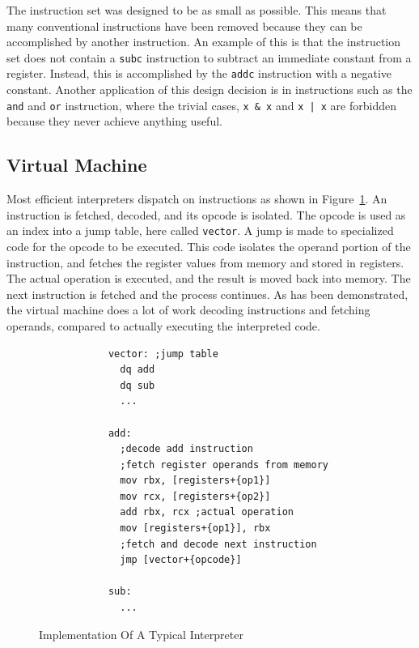 \documentclass[A4]{sig-alternate}
\begin{document}
The instruction set was designed to be as small as possible. This means that many conventional instructions have been removed because they can be accomplished by another instruction. An example of this is that the instruction set does not contain a \texttt{subc} instruction to subtract an immediate constant from a register. Instead, this is accomplished by the \texttt{addc} instruction with a negative constant. Another application of this design decision is in instructions such as the \texttt{and} and \texttt{or} instruction, where the trivial cases, \texttt{x\,\&\,x} and \texttt{x\,|\,x} are forbidden because they never achieve anything useful.

\subsection{Virtual Machine}

Most efficient interpreters dispatch on instructions as shown in Figure~\ref{code:interpreter}. An instruction is fetched, decoded, and its opcode is isolated. The opcode is used as an index into a jump table, here called \texttt{vector}. A jump is made to specialized code for the opcode to be executed. This code isolates the operand portion of the instruction, and fetches the register values from memory and stored in registers. The actual operation is executed, and the result is moved back into memory. The next instruction is fetched and the process continues. As has been demonstrated, the virtual machine does a lot of work decoding instructions and fetching operands, compared to actually executing the interpreted code. 

\begin{figure}
	\begin{center}
		\begin{minipage}[b]{0.8\linewidth}
			\begin{verbatim}
			vector: ;jump table
			  dq add
			  dq sub
			  ...
			
			add:
			  ;decode add instruction
			  ;fetch register operands from memory
			  mov rbx, [registers+{op1}]
			  mov rcx, [registers+{op2}]
			  add rbx, rcx ;actual operation
			  mov [registers+{op1}], rbx
			  ;fetch and decode next instruction
			  jmp [vector+{opcode}]
			
			sub:
			  ...
			\end{verbatim}
			\caption{Implementation Of A Typical Interpreter}
			\label{code:interpreter}
		\end{minipage}
	\end{center}
\end{figure}
\end{document}
